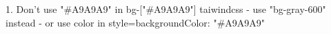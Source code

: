 1. Don't use "#A9A9A9" in bg-["#A9A9A9"] taiwindcss
- use "bg-gray-600" instead
- or use color in style={{backgroundColor: "#A9A9A9"}}
